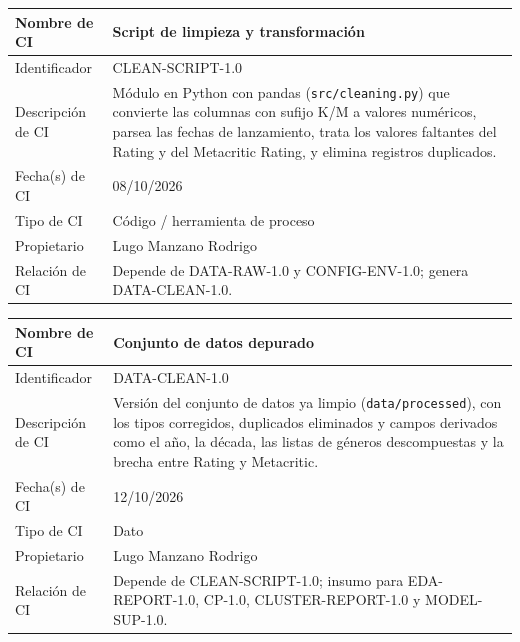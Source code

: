 \documentclass[letterpaper,11pt]{article}
\begin{document}
\noindent\begin{minipage}{\textwidth}
\small\renewcommand{\arraystretch}{1.9}
\begin{tabularx}{\textwidth}{|p{3.3cm}|Y|}
\hline
Nombre de CI & Script de limpieza y transformación \\ \hline
Identificador & CLEAN-SCRIPT-1.0 \\ \hline
Descripción de CI & Módulo en Python con pandas (\texttt{src/cleaning.py}) que convierte las columnas con sufijo K/M a valores numéricos, parsea las fechas de lanzamiento, trata los valores faltantes del Rating y del Metacritic Rating, y elimina registros duplicados. \\ \hline
Fecha(s) de CI & 08/10/2026 \\ \hline
Tipo de CI & Código / herramienta de proceso \\ \hline
Propietario & Lugo Manzano Rodrigo \\ \hline
Relación de CI & Depende de DATA-RAW-1.0 y CONFIG-ENV-1.0; genera DATA-CLEAN-1.0. \\ \hline
\end{tabularx}
\end{minipage}\par\bigskip
\noindent\begin{minipage}{\textwidth}
\small\renewcommand{\arraystretch}{1.9}
\begin{tabularx}{\textwidth}{|p{3.3cm}|Y|}
\hline
Nombre de CI & Conjunto de datos depurado \\ \hline
Identificador & DATA-CLEAN-1.0 \\ \hline
Descripción de CI & Versión del conjunto de datos ya limpio (\texttt{data/processed}), con los tipos corregidos, duplicados eliminados y campos derivados como el año, la década, las listas de géneros descompuestas y la brecha entre Rating y Metacritic. \\ \hline
Fecha(s) de CI & 12/10/2026 \\ \hline
Tipo de CI & Dato \\ \hline
Propietario & Lugo Manzano Rodrigo \\ \hline
Relación de CI & Depende de CLEAN-SCRIPT-1.0; insumo para EDA-REPORT-1.0, CP-1.0, CLUSTER-REPORT-1.0 y MODEL-SUP-1.0. \\ \hline
\end{tabularx}
\end{minipage}\par\bigskip
\end{document}
